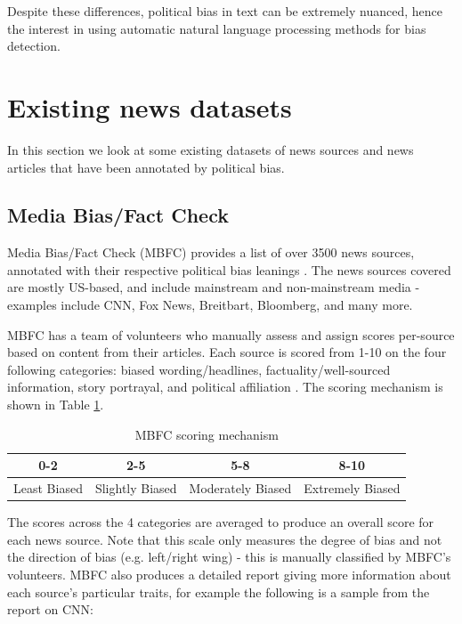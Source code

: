 Despite these differences, political bias in text can be extremely nuanced, hence the interest in using automatic natural language processing methods for bias detection.

\section{Existing news datasets} \label{sec:existing-news-datasets}

In this section we look at some existing datasets of news sources and news articles that have been annotated by political bias.

\subsection{Media Bias/Fact Check}

Media Bias/Fact Check (MBFC) provides a list of over 3500 news sources, annotated with their respective political bias leanings \cite{mbfc}. The news sources covered are mostly US-based, and include mainstream and non-mainstream media - examples include CNN, Fox News, Breitbart, Bloomberg, and many more.

MBFC has a team of volunteers who manually assess and assign scores per-source based on content from their articles. Each source is scored from 1-10 on the four following categories: biased wording/headlines, factuality/well-sourced information, story portrayal, and political affiliation \cite{MBFC-methodology}. The scoring mechanism is shown in Table \ref{tab:MBFC-scoring}.

\begin{table}[ht]
    \centering
    \begin{tabular}{|c|c|c|c|}
        \hline
        0-2 & 2-5 & 5-8 & 8-10 \\
        \hline
        Least Biased & Slightly Biased & Moderately Biased & Extremely Biased \\
        \hline
    \end{tabular}
    \caption{MBFC scoring mechanism}
    \label{tab:MBFC-scoring}
\end{table}

The scores across the 4 categories are averaged to produce an overall score for each news source. Note that this scale only measures the degree of bias and not the direction of bias (e.g. left/right wing) - this is manually classified by MBFC's volunteers. MBFC also produces a detailed report giving more information about each source's particular traits, for example the following is a sample from the report on CNN:


